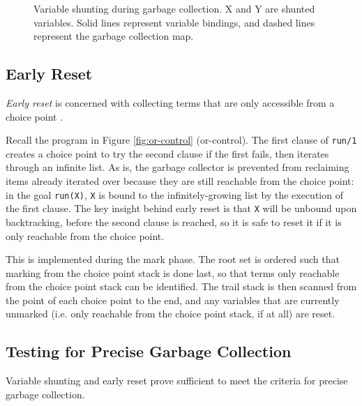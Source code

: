 \begin{enumerate}
\begin{figure}[H]
\caption{Variable shunting during garbage collection. X and Y are shunted variables. Solid lines represent variable bindings, and dashed lines represent the garbage collection map.}
\label{fig:shunt-cases}
\end{figure}

\end{enumerate}

\subsection{Early Reset}

\emph{Early reset} is concerned with collecting terms that are only accessible from a choice point \cite{applebyGarbargecollectionProlog1988}.

Recall the program in Figure \ref{fig:or-control} (or-control). The first clause of \texttt{run/1} creates a choice point to try the second clause if the first fails, then iterates through an infinite list. As is, the garbage collector is prevented from reclaiming items already iterated over because they are still reachable from the choice point: in the goal \texttt{run(X)}, \texttt{X} is bound to the infinitely-growing list by the execution of the first clause. The key insight behind early reset is that \texttt{X} will be unbound upon backtracking, before the second clause is reached, so it is safe to reset it if it is only reachable from the choice point.

This is implemented during the mark phase. The root set is ordered such that marking from the choice point stack is done last, so that terms only reachable from the choice point stack can be identified. The trail stack is then scanned from the point of each choice point to the end, and any variables that are currently unmarked (i.e. only reachable from the choice point stack, if at all) are reset.

\subsection{Testing for Precise Garbage Collection}

Variable shunting and early reset prove sufficient to meet the criteria for precise garbage collection.

